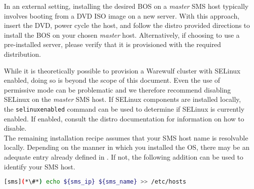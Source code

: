 In an external setting, installing the desired BOS on a {\em master} SMS host
typically involves booting from a DVD ISO image on a new server. With this
approach, insert the \baseOS{} DVD, power cycle the host, and follow the distro
provided directions to install the BOS on your chosen {\em master} host.
Alternatively, if choosing to use a pre-installed server, please verify that it
is provisioned with the required \baseOS{} distribution.

\begin{center}
\begin{tcolorbox}[]
\small
While it is theoretically possible to provision a Warewulf cluster with SELinux
enabled, doing so is beyond the scope of this document. Even the use of
permissive mode can be problematic and we therefore recommend disabling SELinux on the {\em
master} SMS host. If SELinux components are installed locally,
the \texttt{selinuxenabled} command can be used to determine if SELinux is
currently enabled. If enabled, consult the distro documentation for information
on how to disable. \\

\small The remaining installation recipe assumes that your SMS host name is
resolvable locally. Depending on the manner in which you installed the OS,
there may be an adequate entry already defined in . If not,
the following addition can be used to identify your SMS host.
\begin{lstlisting}[language=bash]
[sms](*\#*) echo ${sms_ip} ${sms_name} >> /etc/hosts
\end{lstlisting}
\end{tcolorbox}
\end{center}

